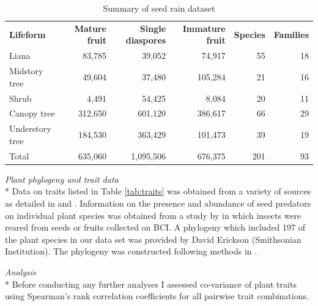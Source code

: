 \begin{table}
    \centering
    \caption{Summary of seed rain dataset}
    \small
    \begin{tabular}{lrrrrr}
        \textbf{Lifeform} &     \textbf{Mature fruit} &      \textbf{Single diaspores} &     \textbf{Immature fruit} &      \textbf{Species} &         \textbf{Families} \\
        Liana &                83,785  &                39,052  &                74,917  &     55  &                         18  \\
        Midstory tree &                49,604  &                37,480  &              105,284  &      21  &                         16  \\
        Shrub &                   4,491  &                54,425  &                   8,084  &     20  &                         11  \\
        Canopy tree &              312,650  &              601,120  &              386,617  &               66  &                         29  \\
        Understory tree &              184,530  &              363,429  &              101,473  &      39  &                         19  \\ \hline
         Total &              635,060  &          1,095,506  &              676,375  &            201  &                         93  \\ \hline
    \end{tabular}
    \label{tab:summary}
\end{table}

\emph{Plant phylogeny and trait data}\\*
Data on traits listed in Table \ref{tab:traits} was obtained from a variety of sources as detailed in \cite{gripenbergHighlyResolvedFood2019} and \cite{wrightFunctionalTraitsGrowth2010}. Information on the presence and abundance of seed predators on individual plant species was obtained from a study by \cite{gripenbergHighlyResolvedFood2019} in which insects were reared from seeds or fruits collected on BCI. A phylogeny which included 197 of the plant species in our data set was provided by David Erickson (Smithsonian Institution).  The phylogeny was constructed following methods in \cite{kressPlantDNABarcodes2009}.

\emph{Analysis}\\*
Before conducting any further analyses I assessed co-variance of plant traits using Spearman’s rank correlation coefficients for all pairwise trait combinations.

